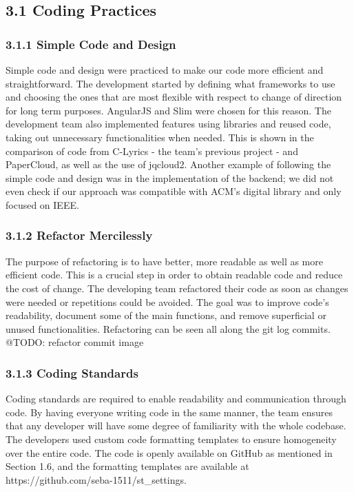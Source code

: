 \documentclass[]{article}
\begin{document}
\subsection{3.1 Coding Practices}\label{coding-practices}

\subsubsection{3.1.1 Simple Code and
Design}\label{simple-code-and-design}

Simple code and design were practiced to make our code more efficient
and straightforward. The development started by defining what frameworks
to use and choosing the ones that are most flexible with respect to
change of direction for long term purposes. AngularJS and Slim were
chosen for this reason. The development team also implemented features
using libraries and reused code, taking out unnecessary functionalities
when needed. This is shown in the comparison of code from C-Lyrics - the
team's previous project - and PaperCloud, as well as the use of
jqcloud2. Another example of following the simple code and design was in
the implementation of the backend; we did not even check if our approach
was compatible with ACM's digital library and only focused on IEEE.

\subsubsection{3.1.2 Refactor Mercilessly}\label{refactor-mercilessly}

The purpose of refactoring is to have better, more readable as well as
more efficient code. This is a crucial step in order to obtain readable
code and reduce the cost of change. The developing team refactored their
code as soon as changes were needed or repetitions could be avoided. The
goal was to improve code's readability, document some of the main
functions, and remove superficial or unused functionalities. Refactoring
can be seen all along the git log commits. @TODO: refactor commit image

\subsubsection{3.1.3 Coding Standards}\label{coding-standards}

Coding standards are required to enable readability and communication
through code. By having everyone writing code in the same manner, the
team ensures that any developer will have some degree of familiarity
with the whole codebase. The developers used custom code formatting
templates to ensure homogeneity over the entire code. The code is openly
available on GitHub as mentioned in Section 1.6, and the formatting
templates are available at https://github.com/seba-1511/st\_settings.
\end{document}

